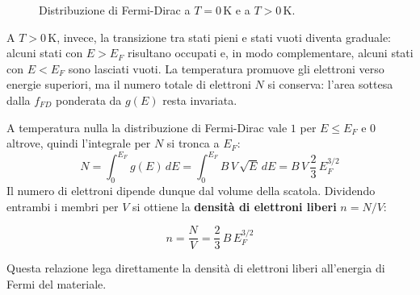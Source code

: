 \begin{figure}[htbp]
    \centering
    \caption{Distribuzione di Fermi-Dirac a \(T = 0\,\text{K}\) e a \(T > 0\,\text{K}\).}
    \label{fig:fermi_dirac}
\end{figure}

A \(T > 0\,\text{K}\), invece, la transizione tra stati pieni e stati vuoti diventa graduale: alcuni stati con \(E > E_F\) risultano occupati e, in modo complementare, alcuni stati con \(E < E_F\) sono lasciati vuoti. La temperatura promuove gli elettroni verso energie superiori, ma il numero totale di elettroni \(N\) si conserva: l'area sottesa dalla \(f_{FD}\) ponderata da \(g(E)\) resta invariata.

A temperatura nulla la distribuzione di Fermi-Dirac vale \(1\) per \(E \leq E_F\) e \(0\) altrove, quindi l'integrale per \(N\) si tronca a \(E_F\):
\begin{equation}
    N = \int_0^{E_F} g(E)\, dE = \int_0^{E_F} B\, V\, \sqrt{E}\, dE = B\, V\, \frac{2}{3}\, E_F^{3/2}
\end{equation}
Il numero di elettroni dipende dunque dal volume della scatola. Dividendo entrambi i membri per \(V\) si ottiene la \textbf{densità di elettroni liberi} \(n = N/V\):
\begin{importantbox}
    \begin{equation}
        n = \frac{N}{V} = \frac{2}{3}\, B\, E_F^{3/2}
    \end{equation}
\end{importantbox}
Questa relazione lega direttamente la densità di elettroni liberi all'energia di Fermi del materiale.

